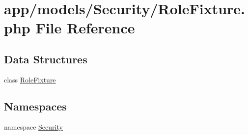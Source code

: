 \hypertarget{_role_fixture_8php}{\section{app/models/\-Security/\-Role\-Fixture.php File Reference}
\label{_role_fixture_8php}
}
\subsection*{Data Structures}
\begin{DoxyCompactItemize}
\item 
class \hyperlink{class_security_1_1_role_fixture}{Role\-Fixture}
\end{DoxyCompactItemize}
\subsection*{Namespaces}
\begin{DoxyCompactItemize}
\item 
namespace \hyperlink{namespace_security}{Security}
\end{DoxyCompactItemize}
